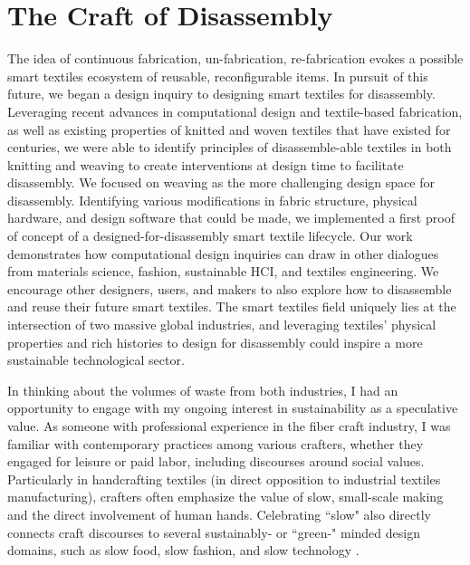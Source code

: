 \section{The Craft of Disassembly}

The idea of continuous fabrication, un-fabrication, re-fabrication evokes a possible smart textiles ecosystem of reusable, reconfigurable items. In pursuit of this future, we began a design inquiry to designing smart textiles for disassembly. Leveraging recent advances in computational design and textile-based fabrication, as well as existing properties of knitted and woven textiles that have existed for centuries, we were able to identify principles of disassemble-able textiles in both knitting and weaving to create interventions at design time to facilitate disassembly. We focused on weaving as the more challenging design space for disassembly. Identifying various modifications in fabric structure, physical hardware, and design software that could be made, we implemented a first proof of concept of a designed-for-disassembly smart textile lifecycle. Our work demonstrates how computational design inquiries can draw in other dialogues from materials science, fashion, sustainable HCI, and textiles engineering. We encourage other designers, users, and makers to also explore how to disassemble and reuse their future smart textiles. The smart textiles field uniquely lies at the intersection of two massive global industries, and leveraging textiles' physical properties and rich histories to design for disassembly could inspire a more sustainable technological sector. 

In thinking about the volumes of waste from both industries, I had an opportunity to engage with my ongoing interest in sustainability as a speculative value. As someone with professional experience in the fiber craft industry, I was familiar with contemporary practices among various crafters, whether they engaged for leisure or paid labor, including discourses around social values. Particularly in handcrafting textiles (in direct opposition to industrial textiles manufacturing), crafters often emphasize the value of slow, small-scale making and the direct involvement of human hands. Celebrating ``slow" also directly connects craft discourses to several sustainably- or ``green-" minded design domains, such as slow food, slow fashion, and slow technology \cite{frater_hand-crafted_2018,odom_time_2018,phelan_what_2017}.

